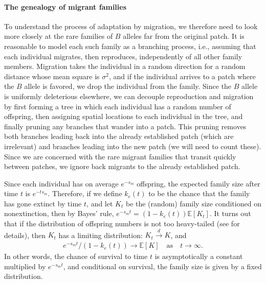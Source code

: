 \documentclass{article}
\newcommand{\citet}[1]{\cite{#1}}
\newcommand{\E}{\mathbb{E}}
\newcommand{\dconv}{\xrightarrow{d}}
\begin{document}
\paragraph{The genealogy of migrant families}
\label{ss:migrant_math}

To understand the process of adaptation by migration,
we therefore need to look more closely at the rare families of $B$ alleles 
far from the original patch.
It is reasonable to model each such family as a branching process,
i.e., assuming that each individual
migrates, then reproduces, independently of all other family members.
Migration takes the individual in a random direction
for a random distance whose mean square is $\sigma^2$,
and if the individual arrives to a patch where the $B$ allele is favored, 
we drop the individual from the family.
Since the $B$ allele is uniformly deleterious elsewhere,
we can decouple reproduction and migration
by first forming a tree in which each individual has a random number of offspring,
then assigning spatial locations to each individual in the tree,
and finally pruning any branches that wander into a patch.
This pruning removes both branches leading back into the already established patch (which are irrelevant)
and branches leading into the new patch (we will need to count these).
Since we are concerned with the rare migrant families that transit quickly between patches, 
we ignore back migrants to the already established patch. 

Since each individual has on average $e^{-s_m}$ offspring,
the expected family size after time $t$ is $e^{- t s_m}$.
Therefore, if we define $k_e(t)$ to be the chance that the family
has gone extinct by time $t$, 
and let $K_t$ be the (random) family size conditioned on nonextinction,
then by Bayes' rule, $e^{-s_m t} = (1-k_e(t))\E[K_t]$.
It turns out that if the distribution of offspring numbers is not too heavy-tailed 
(see \citet{jagers1975branching} for details),
then $K_t$ has a limiting distribution: $K_t \dconv K$,
and 
\begin{align} \label{eqn:EK_limit}
    e^{-s_m t}/(1-k_e(t)) \to \E[K] \quad \text{as} \quad t \to \infty .
\end{align}
In other words, the chance of survival to time $t$ is asymptotically a constant multiplied by $e^{-s_m t}$,
and conditional on survival, the family size is given by a fixed distribution.
\end{document}
